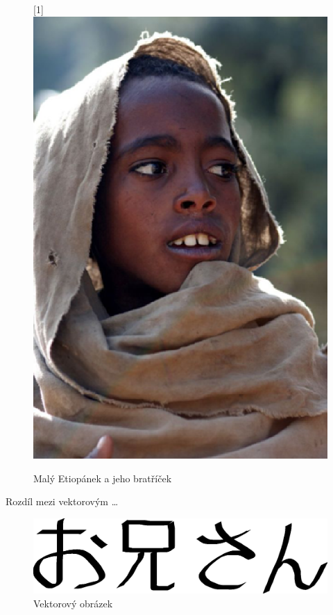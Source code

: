\documentclass[a4paper, 11pt, column] {article}
\begin{document}
\begin{figure}[h]
    \scalebox{-1}[1]{\includegraphics[scale=0.4]{etiopan.eps}}
    \caption{Malý Etiopánek a jeho bratříček}
\end{figure}
\pagebreak

Rozdíl mezi vektorovým \dots
\begin{figure}[h]
    \centering
    \includegraphics[scale=0.4]{oniisan.eps}
    \caption{Vektorový obrázek}
\end{figure}
\end{document}
